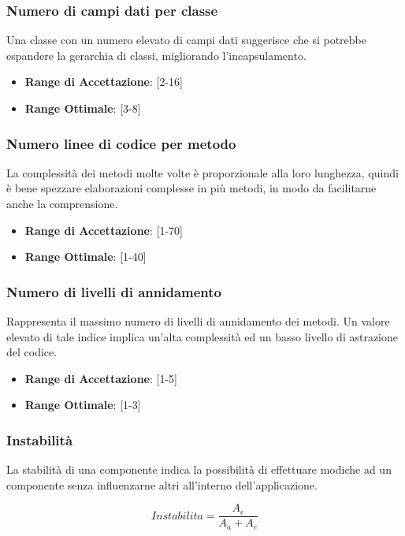 \documentclass[12pt,a4paper]{article}
\begin{document}
\subsubsection{Numero di campi dati per classe}
Una classe con un numero elevato di campi dati suggerisce che si potrebbe espandere la gerarchia di classi, migliorando l'incapsulamento.

\begin{itemize}
\item \textbf{Range di Accettazione}: [2-16]
\item \textbf{Range Ottimale}: [3-8]
\end{itemize}

\subsubsection{Numero linee di codice per metodo}
La complessità dei metodi molte volte è proporzionale alla loro lunghezza, quindi è bene spezzare elaborazioni complesse in più metodi, in modo da facilitarne anche la comprensione.

\begin{itemize}
\item \textbf{Range di Accettazione}: [1-70]
\item \textbf{Range Ottimale}: [1-40]
\end{itemize}

\subsubsection{Numero di livelli di annidamento}
Rappresenta il massimo numero di livelli di annidamento dei metodi. Un valore elevato di tale indice implica un'alta complessità ed un basso livello di astrazione del codice.

\begin{itemize}
\item \textbf{Range di Accettazione}: [1-5]
\item \textbf{Range Ottimale}: [1-3]
\end{itemize}

\subsubsection{Instabilità}
La stabilità di una componente indica la possibilità di effettuare modiche ad un componente senza influenzarne altri all'interno dell'applicazione.

\[Instabilita=\frac{A_e}{A_a+A_e}\]
\end{document}
